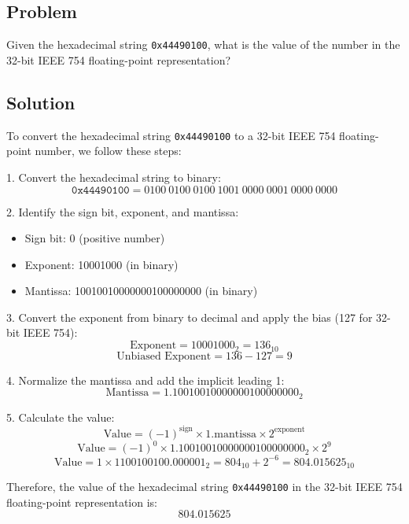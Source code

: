 \subsection*{Problem}

Given the hexadecimal string \texttt{0x44490100}, what is the value of the number in the 32-bit IEEE 754 floating-point representation?

\subsection*{Solution}

To convert the hexadecimal string \texttt{0x44490100} to a 32-bit IEEE 754 floating-point number, we follow these steps:

1. Convert the hexadecimal string to binary:
\[
\texttt{0x44490100} = 0100\ 0100\ 0100\ 1001\ 0000\ 0001\ 0000\ 0000
\]

2. Identify the sign bit, exponent, and mantissa:
\begin{itemize}
    \item Sign bit: 0 (positive number)
    \item Exponent: 10001000 (in binary)
    \item Mantissa: 10010010000000100000000 (in binary)
\end{itemize}

3. Convert the exponent from binary to decimal and apply the bias (127 for 32-bit IEEE 754):
\[
\text{Exponent} = 10001000_2 = 136_{10}
\]
\[
\text{Unbiased Exponent} = 136 - 127 = 9
\]

4. Normalize the mantissa and add the implicit leading 1:
\[
\text{Mantissa} = 1.10010010000000100000000_2
\]

5. Calculate the value:
\[
\text{Value} = (-1)^{\text{sign}} \times 1.\text{mantissa} \times 2^{\text{exponent}}
\]
\[
\text{Value} = (-1)^0 \times 1.10010010000000100000000_2 \times 2^9
\]
\[
\text{Value} = 1 \times 1100100100.000001_2 = 804_{10} + 2^{-6} = 804.015625_{10}
\]

Therefore, the value of the hexadecimal string \texttt{0x44490100} in the 32-bit IEEE 754 floating-point representation is:
\[
    804.015625
\]
